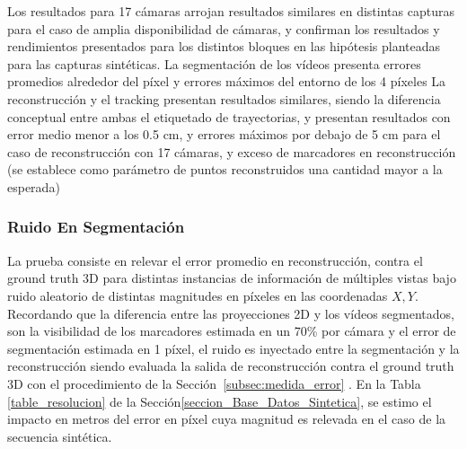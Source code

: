 Los resultados para 17 cámaras arrojan resultados similares en distintas capturas para el caso de amplia disponibilidad de cámaras, y confirman los resultados y rendimientos presentados para los distintos bloques en las hipótesis planteadas para las capturas sintéticas. La segmentación de los vídeos presenta errores promedios alrededor del píxel y errores máximos del entorno de los 4 píxeles La reconstrucción y el tracking presentan resultados similares, siendo la diferencia conceptual entre ambas el etiquetado de trayectorias, y presentan resultados con error medio menor a los 0.5 cm, y errores máximos por debajo de 5 cm para el caso de reconstrucción con 17 cámaras, y exceso de marcadores en reconstrucción (se establece como parámetro de puntos reconstruidos una cantidad mayor a la esperada) 

\subsubsection{Ruido En Segmentación}

La prueba consiste en relevar el error promedio en reconstrucción, contra el ground truth 3D para distintas instancias de información de múltiples vistas bajo ruido aleatorio de distintas magnitudes en píxeles en las coordenadas $X,Y$. Recordando que la diferencia entre las proyecciones 2D y los vídeos segmentados, son la visibilidad de los marcadores estimada en un 70\% por cámara y el error de segmentación estimada en 1 píxel, el ruido es inyectado entre la segmentación y la reconstrucción siendo evaluada la salida de reconstrucción contra el ground truth 3D con el procedimiento de la Sección~\ref{subsec:medida_error} . En la Tabla \ref{table_resolucion} de la Sección\ref{seccion_Base_Datos_Sintetica}, se estimo el impacto en metros del error en píxel cuya magnitud es relevada en el caso de la secuencia sintética.

